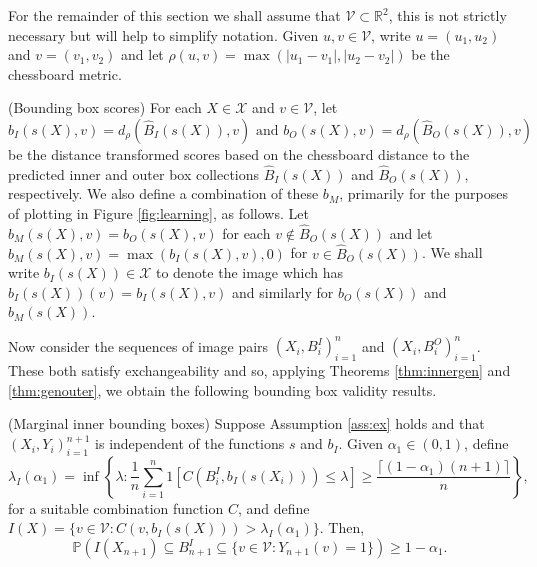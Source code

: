 For the remainder of this section we shall assume that $\mathcal{V} \subset \mathbb{R}^2$, this is not strictly necessary but will help to simplify notation. Given $u,v \in \mathcal{V}$, write $u = (u_1, u_2)$ and $v = (v_1, v_2)$ and let $\rho(u,v) = \max \left( |u_1 - v_1|, |u_2 - v_2| \right)$ be the chessboard metric. 
\begin{definition}\label{dfn:BBS}
	(Bounding box scores) For each $X \in \mathcal{X}$ and $v \in \mathcal{V}$, let
	\begin{equation*}
		b_I(s(X), v) = d_{\rho}(\hat{B}_I(s(X)), v) \text{ and } b_O(s(X), v) = d_{\rho}(\hat{B}_O(s(X)), v) 
	\end{equation*}
be the distance transformed scores based on the chessboard distance to the predicted inner and outer box collections $\hat{B}_I(s(X))$ and $\hat{B}_O(s(X))$, respectively. We also define a combination of these $b_M$, primarily for the purposes of plotting in Figure \ref{fig:learning}, as follows. Let $b_M(s(X), v) = b_O(s(X),v)$ for each $v \not\in \hat{B}_O(s(X))$ and let $b_M(s(X), v) = \max(b_I(s(X),v), 0) $ for $v \in \hat{B}_O(s(X))$. We shall write $b_I(s(X)) \in \mathcal{X}$ to denote the image which has $b_I(s(X))(v) = 	b_I(s(X), v)$ and similarly for $b_O(s(X))$ and $b_M(s(X))$. 
\end{definition}
Now consider the sequences of image pairs $(X_i, B_i^I)_{i = 1}^n$ and $(X_i, B_i^O)_{i = 1}^n$. These both satisfy exchangeability and so, applying Theorems \ref{thm:innergen} and \ref{thm:genouter}, we obtain the following bounding box validity results.
\begin{corollary}\label{thm:boxinnergen}
	(Marginal inner bounding boxes)
	Suppose Assumption \ref{ass:ex} holds and that $(X_i, Y_i)_{i = 1}^{n+1}$ is independent of the functions $s$ and $b_I$.  Given $\alpha_1 \in (0,1)$, define 
	\begin{equation}
		\lambda_I(\alpha_1) = \inf\left\lbrace \lambda: \frac{1}{n} \sum_{i = 1}^n 1\left[ C(B^I_i, b_I(s(X_i))) \leq \lambda \right] \geq  \frac{\lceil (1-\alpha_1)(n+1) \rceil}{n} \right\rbrace,
	\end{equation}
	for a suitable combination function $C$, and define $I(X) = \lbrace v \in \mathcal{V}: C(v, b_I(s(X))) >\lambda_I(\alpha_1)  \rbrace $. Then,
	\begin{equation*}\label{eq:probstat}
		\mathbb{P}\left( I(X_{n+1}) \subseteq B^I_{n+1} \subseteq\lbrace v\in \mathcal{V}: Y_{n+1}(v) = 1 \rbrace \right) \geq 1 - \alpha_1.
	\end{equation*}
\end{corollary}
